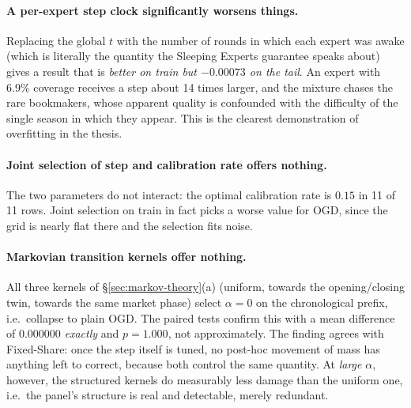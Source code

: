 \documentclass[12pt,a4paper,oneside]{report}
\renewcommand{\_}{\oldunderscore\allowbreak}
\theoremstyle{definition}
\theoremstyle{plain}
\theoremstyle{definition}   %
\begin{document}
\paragraph{A per-expert step clock significantly worsens things.} Replacing the global $t$ with
the number of rounds in which each expert was awake (which is literally the quantity the
Sleeping Experts guarantee speaks about) gives a result that is \emph{better on train but
$-0.00073$ on the tail}. An expert with 6.9\% coverage receives a step about 14 times larger,
and the mixture chases the rare bookmakers, whose apparent quality is confounded with the
difficulty of the single season in which they appear. This is the clearest demonstration of
overfitting in the thesis.

\paragraph{Joint selection of step and calibration rate offers nothing.} The two parameters do not
interact: the optimal calibration rate is $0.15$ in 11 of 11 rows. Joint selection on train in fact
picks a worse value for OGD, since the grid is nearly flat there and the selection fits noise.

\paragraph{Markovian transition kernels offer nothing.} All three kernels of
\S\ref{sec:markov-theory}(a) (uniform, towards the opening/closing twin, towards the same
market phase) select $\alpha = 0$ on the chronological prefix, i.e.\ collapse to plain OGD. The
paired tests confirm this with a mean difference of $0.000000$ \emph{exactly} and $p=1.000$,
not approximately. The finding agrees with Fixed-Share: once the step itself is tuned, no
post-hoc movement of mass has anything left to correct, because both control the same quantity.
At \emph{large} $\alpha$, however, the structured kernels do measurably
less damage than the uniform one, i.e.\ the panel's structure is real and detectable, merely
redundant.
\end{document}
